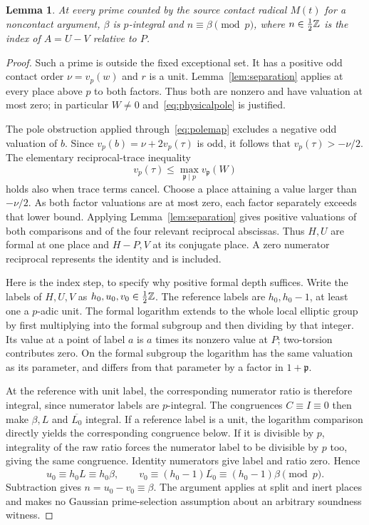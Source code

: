 \documentclass[11pt,a4paper]{article}
\newtheorem{lemma}[theorem]{Lemma}
\theoremstyle{remark}\newtheorem{remark}[theorem]{Remark}
\begin{document}
\begin{lemma}\label{lem:local}
At every prime counted by the source contact radical $M(t)$ for a
noncontact argument, $\beta$ is $p$-integral and
$n\equiv\beta\pmod p$, where $n\in\tfrac12\mathbb Z$ is the index of
$A=U-V$ relative to $P$.
\end{lemma}
\begin{proof}
Such a prime is outside the fixed exceptional set. It has a positive
odd contact order $\nu=v_p(w)$ and $r$ is a unit. Lemma~\ref{lem:separation}
applies at every place above $p$ to both factors. Thus both are
nonzero and have valuation at most zero; in particular $W\ne0$
and~\eqref{eq:physicalpole} is justified.

The pole obstruction applied through~\eqref{eq:polemap} excludes a
negative odd valuation of $b$. Since
$v_p(b)=\nu+2v_p(\tau)$ is odd, it follows that
$v_p(\tau)>-\nu/2$. The elementary reciprocal-trace inequality
\[
                  v_p(\tau)\le\max_{\mathfrak p\mid p}v_{\mathfrak p}(W)
\]
holds also when trace terms cancel. Choose a place attaining a value
larger than $-\nu/2$. As both factor valuations are at most zero,
each factor separately exceeds that lower bound. Applying
Lemma~\ref{lem:separation} gives positive valuations of both comparisons
and of the four relevant reciprocal abscissas. Thus $H,U$ are formal
at one place and $H-P,V$ at its conjugate place. A zero numerator
reciprocal represents the identity and is included.

Here is the index step, to specify why positive formal depth suffices.
Write the labels of $H,U,V$ as $h_0,u_0,v_0\in\tfrac12\mathbb Z$.
The reference labels are $h_0,h_0-1$, at least one a $p$-adic unit.
The formal logarithm extends to the whole local elliptic group by
first multiplying into the formal subgroup and then dividing by that
integer. Its value at a point of label $a$ is $a$ times its nonzero
value at $P$; two-torsion contributes zero. On the formal subgroup
the logarithm has the same valuation as its parameter, and differs
from that parameter by a factor in $1+\mathfrak p$.

At the reference with unit label, the corresponding numerator ratio
is therefore integral, since numerator labels are $p$-integral.
The congruences $C\equiv I\equiv0$ then make $\beta,L$ and
$\overline{L_0}$ integral. If a reference label is a unit, the
logarithm comparison directly yields the corresponding congruence
below. If it is divisible by $p$, integrality of the raw ratio forces
the numerator label to be divisible by $p$ too, giving the same
congruence. Identity numerators give label and ratio zero. Hence
\[
 u_0\equiv h_0L\equiv h_0\beta,\qquad
 v_0\equiv(h_0-1)\overline{L_0}\equiv(h_0-1)\beta\pmod p.
\]
Subtraction gives $n=u_0-v_0\equiv\beta$. The argument applies at
split and inert places and makes no Gaussian prime-selection assumption
about an arbitrary soundness witness.
\end{proof}
\end{document}
